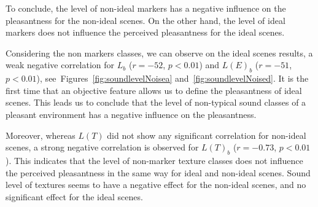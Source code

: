 \documentclass[12pt]{elsarticle}
\newcommand{\cf}{cf.}
\begin{document}

To conclude, the level of non-ideal markers has a negative influence on the pleasantness for the non-ideal scenes. On the other hand, the level of ideal markers does not influence the perceived pleasantness for the ideal scenes.


Considering the non markers classes, we can observe on the ideal scenes results, a weak negative correlation for $L_b$  ($r=-52$, $p<0.01$) and $L(E)_b$ ($r=-51$, $p<0.01$), see~Figures~\ref{fig:soundlevelNoisea} and~\ref{fig:soundlevelNoised}. It is the first time that an objective feature allows us to define the pleasantness of ideal scenes. This leads us to conclude that the level of non-typical sound classes of a pleasant environment has a negative influence on the pleasantness.


Moreover, whereas $L(T)$ did not show any significant correlation for non-ideal scenes, a strong negative correlation is observed for $L(T)_b$ ($r = -0.73$, $p < 0.01$). This indicates that the level of non-marker texture classes does not influence the perceived pleasantness in the same way for ideal and non-ideal scenes. Sound level of textures seems to have a negative effect for the non-ideal scenes, and no significant effect for the ideal scenes.

\end{document}
